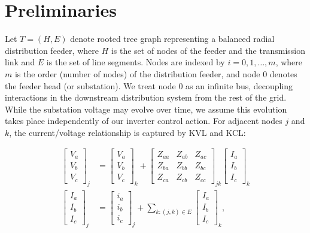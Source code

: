 \section{Preliminaries}

\setlength{\abovedisplayskip}{-5pt} \setlength{\abovedisplayshortskip}{-5pt}
\setlength{\belowdisplayskip}{0pt} \setlength{\belowdisplayshortskip}{0pt}

Let $T = (H,E)$ denote rooted tree graph representing a balanced radial distribution feeder, where $H$ is the set of nodes of the feeder and the transmission link and $E$ is the set of line segments.  Nodes are indexed by $i = 0,1,\dots,m$, where $m$ is the order (number of nodes) of the distribution feeder, and node 0 denotes the feeder head (or substation).  We treat node 0 as an infinite bus, decoupling interactions in the downstream distribution system from the rest of the grid.  While the substation voltage may evolve over time, we assume this evolution takes place independently of our inverter control action.  For adjacent nodes $j$ and $k$, the current/voltage relationship is captured by KVL and KCL:

\begin{align}
	    \begin{bmatrix}
  		V_{a} \\
  		V_{b} \\
  		V_{c}
  	\end{bmatrix}_{j}
  	&=
  	\begin{bmatrix}
  		V_{a} \\
  		V_{b} \\
  		V_{c}
  	\end{bmatrix}_{k}
  	+
  	\begin{bmatrix}
  		Z_{aa} & Z_{ab} & Z_{ac} \\
  		Z_{ba} & Z_{bb} & Z_{bc} \\
  		Z_{ca} & Z_{cb} & Z_{cc}
  	\end{bmatrix}_{jk}
  	\begin{bmatrix}
  		I_{a} \\
  		I_{b} \\
  		I_{c}
  	\end{bmatrix}_k \label{eq:KVL}
    \\
    \begin{bmatrix}
  		I_{a} \\
  		I_{b} \\
  		I_{c}
  	\end{bmatrix}_{j}
  	&= \begin{bmatrix}
  		i_{a} \\
  		i_{b} \\
  		i_{c}
  	\end{bmatrix}_{j} + \sum_{k:(j,k) \in E}
  	\begin{bmatrix}
  		I_{a} \\
  		I_{b} \\
  		I_{c}
  	\end{bmatrix}_{k}\label{eq:KCL},
\end{align} 

